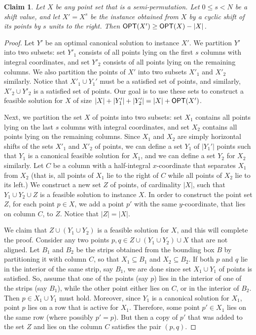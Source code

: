 \documentclass[11pt]{article}
\numberwithin{equation}{section}
\newtheorem{claim}[theorem]{Claim}
\theoremstyle{definition}
\theoremstyle{plain}
\begin{document}
\begin{claim}\label{claim: shifting does not hurt opt}
Let $X$ be any point set that is a semi-permutation. Let $0\leq s<N$ be a shift value, and let $X'=X^s$ be the instance obtained from $X$ by a cyclic shift of its points by $s$ units to the right. 
Then $\mbox{\sf OPT}(X')\geq \mbox{\sf OPT}(X)-|X|$.
\end{claim}
\begin{proof}

Let $Y'$ be an optimal canonical solution to instance $X'$. 
We partition $Y'$ into two subsets: set $Y'_1$ consists of all points lying on the first $s$ columns with integral coordinates, and set $Y'_2$ consists of all points lying on the remaining columns. 
We also partition the points of $X'$ into two subsets $X'_1$ and $X'_2$ similarly.  Notice that $X'_1\cup Y_1'$ must be a satisfied set of points, and similarly, $X'_2\cup Y'_2$ is a satisfied set of points.
Our goal is to use these sets to construct a feasible solution for $X$ of size $|X|+|Y'_1| + |Y'_2| = |X|+\mbox{\sf OPT}(X')$.
	
Next, we partition the set $X$ of points into two subsets: set $X_1$ contains all points lying on the last $s$ columns with integral coordinates, and set $X_2$ contains all points lying on the remaining columns. 
Since $X_1$ and $X_2$ are simply horizontal shifts of the sets $X'_1$ and $X'_2$ of points, we can define a set $Y_1$ of $|Y_1'|$ points such that $Y_1$ is a canonical feasible solution for $X_1$, and we can define a set $Y_2$ for $X_2$ similarly. 
%
Let $C$ be a column with a half-integral $x$-coordinate that separates $X_1$ from $X_2$ (that is, all points of $X_1$ lie to the right of $C$ while all points of $X_2$ lie to its left.) We construct a new set $Z$ of points, of cardinality $|X|$, such that $Y_1\cup Y_2\cup Z$ is a feasible solution to instance $X$. In order to construct the point set $Z$,
for each point $p \in X$, we add a point $p'$ with the same $y$-coordinate, that lies on column $C$, to $Z$. Notice that $|Z|=|X|$.

 
We claim that $Z \cup (Y_1 \cup Y_2)$ is a feasible solution  for $X$, and this will complete the proof.  
Consider any two points $p,q \in Z \cup (Y_1 \cup Y_2) \cup X$ that are not aligned.
Let $B_1$ and $B_2$ be the strips obtained from the bounding box $B$ by partitioning it with column $C$, so that $X_1\subseteq B_1$ and $X_2\subseteq B_2$. 
If both $p$ and $q$ lie in the interior of the same strip, say $B_1$, we are done since set $X_1\cup Y_1$ of points is satisfied.
So, assume that  one of the points (say $p$) lies in the interior of one of the strips (say $B_1$), while the other point either lies on $C$, or in the interior of $B_2$. Then $p\in X_1\cup Y_1$ must hold. Moreover, since $Y_1$ is a canonical solution for $X_1$, point $p$ lies on a row that is active for $X_1$. Therefore, some point $p'\in X_1$ lies on the same row (where possibly $p'=p$). But then a copy of $p'$ that was added to the set $Z$ and lies on the column $C$ satisfies the pair $(p,q)$.     
\end{proof}
\end{document}
